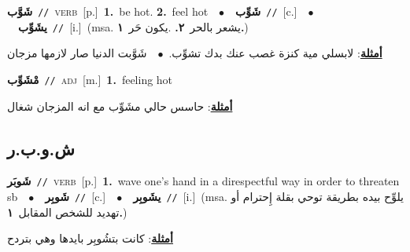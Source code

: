 \documentclass[10pt,a4paper,twoside]{article} %
\begin{document}
\begin{multicols}{2}
{\setlength\topsep{0pt}\textbf{\foreignlanguage{arabic}{شَوَّب}}\ {\color{gray}\texttt{//}\color{black}}\ \textsc{verb}\ [p.]\ \textbf{1.}~be hot.  \textbf{2.}~feel hot\ \ $\bullet$\ \ \setlength\topsep{0pt}\textbf{\foreignlanguage{arabic}{شَوِّب}}\ {\color{gray}\texttt{//}\color{black}}\ [c.]\ \ $\bullet$\ \ \setlength\topsep{0pt}\textbf{\foreignlanguage{arabic}{يشَوِّب}}\ {\color{gray}\texttt{//}\color{black}}\ [i.]\ \color{gray}(msa. \foreignlanguage{arabic}{يشعر بالحر}~\foreignlanguage{arabic}{\textbf{٢.}}  .\foreignlanguage{arabic}{يكون حَر}~\foreignlanguage{arabic}{\textbf{١.}})\color{black}\  \begin{flushright}\color{gray}\foreignlanguage{arabic}{\textbf{\underline{\foreignlanguage{arabic}{أمثلة}}}: لابسلي مية كنزة غصب عنك بدك تشوِّب.\ $\bullet$\ \  شَوَّبت الدنيا صار لازمها مزجان}\end{flushright}\color{black}} \vspace{2mm}

{\setlength\topsep{0pt}\textbf{\foreignlanguage{arabic}{مْشَوِّب}}\ {\color{gray}\texttt{//}\color{black}}\ \textsc{adj}\ [m.]\ \textbf{1.}~feeling hot\  \begin{flushright}\color{gray}\foreignlanguage{arabic}{\textbf{\underline{\foreignlanguage{arabic}{أمثلة}}}: حاسس حالي مشَوِّب مع انه المزجان شغال}\end{flushright}\color{black}} \vspace{2mm}

\vspace{-3mm}
\subsection*{\color{blue}\foreignlanguage{arabic}{ش.و.ب.ر}\color{blue}{}} 

{\setlength\topsep{0pt}\textbf{\foreignlanguage{arabic}{شَوبَر}}\ {\color{gray}\texttt{//}\color{black}}\ \textsc{verb}\ [p.]\ \textbf{1.}~wave one's hand in a direspectful way in order to threaten sb\ \ $\bullet$\ \ \setlength\topsep{0pt}\textbf{\foreignlanguage{arabic}{شَوبِر}}\ {\color{gray}\texttt{//}\color{black}}\ [c.]\ \ $\bullet$\ \ \setlength\topsep{0pt}\textbf{\foreignlanguage{arabic}{يشَوبِر}}\ {\color{gray}\texttt{//}\color{black}}\ [i.]\ \color{gray}(msa. \foreignlanguage{arabic}{يلوِّح بيده بطريقة توحي بقلة إِحترام أو تهديد للشخص المقابل}~\foreignlanguage{arabic}{\textbf{١.}})\color{black}\  \begin{flushright}\color{gray}\foreignlanguage{arabic}{\textbf{\underline{\foreignlanguage{arabic}{أمثلة}}}: كانت بتشُوبِر بايدها وهي بتردح}\end{flushright}\color{black}} \vspace{2mm}


\end{multicols}
\end{document}
